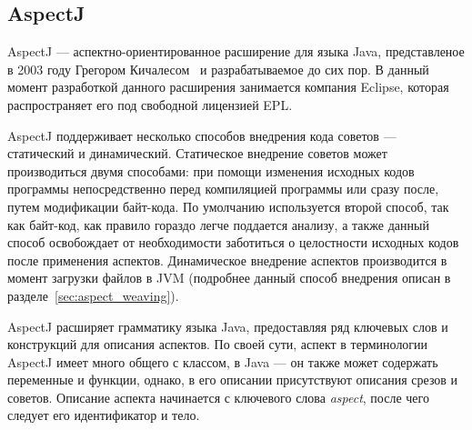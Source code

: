 \subsection{AspectJ}
\label{sub:aspectj_overwiev}

AspectJ --- аспектно-ориентированное расширение для языка Java, представленое в
2003 году Грегором Кичалесом~\cite{kiczales_aspectj} и разрабатываемое до сих
пор.
В данный момент разработкой данного расширения занимается компания Eclipse,
которая распространяет его под свободной лицензией EPL.

AspectJ поддерживает несколько способов внедрения кода советов --- статический и
динамический.
Статическое внедрение советов может производиться двумя способами: при помощи
изменения исходных кодов программы непосредственно перед компиляцией программы
или сразу после, путем модификации байт-кода.
По умолчанию используется второй способ, так как байт-код, как правило гораздо
легче поддается анализу, а также данный способ освобождает от необходимости
заботиться о целостности исходных кодов после применения аспектов.
Динамическое внедрение аспектов производится в момент загрузки файлов в JVM
(подробнее данный способ внедрения описан в разделе~\ref{sec:aspect_weaving}).

AspectJ расширяет грамматику языка Java, предоставляя ряд ключевых слов и
конструкций для описания аспектов.
По своей сути, аспект в терминологии AspectJ имеет много общего с классом, в
Java --- он также может содержать переменные и функции, однако, в его описании
присутствуют описания срезов и советов.
Описание аспекта начинается с ключевого слова \textit{aspect}, после чего
следует его идентификатор и тело.

